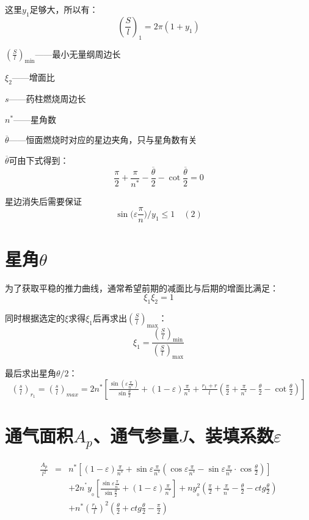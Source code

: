 这里$y_{1}$足够大，所以有：
\[
  \left( \frac{S}{l} \right) _1=2\pi(1+y_{1})
\]

${\left( \frac{S}{l} \right) _{\min}}$——最小无量纲周边长

\vspace{0.8em}
$\xi _2$——增面比

$s$——药柱燃烧周边长

$n^*$——星角数

$\overline{\theta}$——恒面燃烧时对应的星边夹角，只与星角数有关

$\overline{\theta}$可由下式得到：
\[
\frac{\pi}{2}+\frac{\pi}{n^*}-\frac{\overline{\theta }}{2}-\cot \frac{\overline{\theta }}{2}=0
\]

星边消失后需要保证
\[
\sin\mathrm{(}\varepsilon \frac{\pi}{n})/y_1\leqslant 1\hspace{1em}(2)
\]

\section{星角\texorpdfstring{$\theta$}{}}

为了获取平稳的推力曲线，通常希望前期的减面比与后期的增面比满足：
\[
\xi _1\xi _2=1
\]

同时根据选定的$\xi$求得$\xi_{1}$后再求出$\left( \frac{S}{l} \right) _{\max}$：
\[
\xi _1=\frac{\left( \frac{S}{l} \right) _{\min}}{\left( \frac{S}{l} \right) _{\max}}
\]

最后求出星角$\theta /2$：
\begingroup
\fontsize{16}{14}\selectfont 
\[
\left( \tfrac{s}{l} \right) _{r_1}=\left( \tfrac{s}{l} \right) _{max}=2n^*\left[ \tfrac{\sin \left( \varepsilon \frac{\pi}{n^*} \right)}{\sin \frac{\theta}{2}}+\left( 1-\varepsilon \right) \tfrac{\pi}{n^*}+\tfrac{r_1+r}{l}\left( \tfrac{\pi}{2}+\tfrac{\pi}{n^*}-\tfrac{\theta}{2}-\cot\tfrac{\theta}{2} \right) \right] 
\]
\endgroup
\section{通气面积$A_{p}$、通气参量$J$、装填系数\texorpdfstring{$\varepsilon$}{}}

\begingroup
\fontsize{16}{14}\selectfont 

\[
  \begin{array}{ccl}
    \frac{A_p}{l^2}&		=&		n^*\left[ \left( 1-\varepsilon \right) \frac{\pi}{n^*}+\sin \varepsilon \frac{\pi}{n^*}\left( \cos \varepsilon \frac{\pi}{n^*}-\sin \varepsilon \frac{\pi}{n^*}\cdot \cos \frac{\theta}{2} \right) \right]\\[1em]
    &		&		+2n^{^*}y_{_0}\left[ \frac{\sin \varepsilon \frac{\pi}{n^{^*}}}{\sin \frac{\theta}{2}}+(1-\varepsilon )\frac{\pi}{n^{^*}} \right] +ny_{_0}^{2}\left( \frac{\pi}{2}+\frac{\pi}{n^{^*}}-\frac{\theta}{2}-ctg\frac{\theta}{2} \right)\\[1em]
    &		&		+n^*\left( \frac{r_1}{l} \right) ^2\left( \frac{\theta}{2}+ctg\frac{\theta}{2}-\frac{\pi}{2} \right)\\
  \end{array}
  \]

